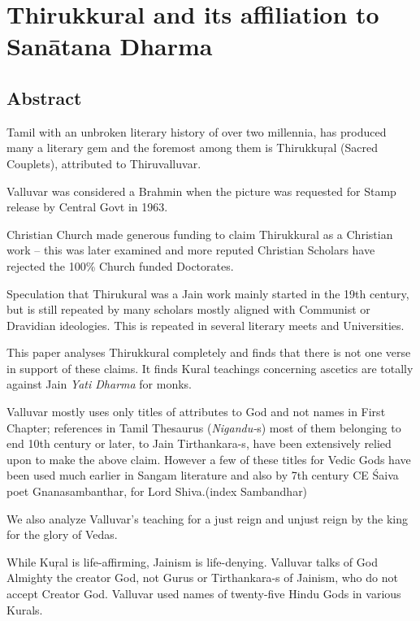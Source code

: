 
\chapter{Thirukkural and its affiliation to Sanātana Dharma}\label{intro}



\section*{Abstract}

Tamil with an unbroken literary history of over two millennia, has produced many a literary gem and the foremost among them is Thirukkuŗal (Sacred Couplets), attributed to Thiruvalluvar.

Valluvar was considered a Brahmin when the picture was requested for Stamp release by Central Govt in 1963.

Christian Church made generous funding to claim Thirukkural as a Christian work – this was later examined and more reputed Christian Scholars have rejected the 100\% Church funded Doctorates.

Speculation that Thirukural was a Jain work mainly started in the 19th century, but is still repeated by many scholars mostly aligned with Communist or Dravidian ideologies. This is repeated in several literary meets and Universities.

This paper analyses Thirukkural completely and finds that there is not one verse in support of these claims. It finds Kural teachings concerning ascetics are totally against Jain \textit{Yati Dharma} for monks.

Valluvar mostly uses only titles of attributes to God and not names in First Chapter; references in Tamil Thesaurus (\textit{Nigandu-}s) most of them belonging to end 10th century or later, to Jain Tirthankara-s, have been extensively relied upon to make the above claim. However a few of these titles for Vedic Gods have been used much earlier in Sangam literature and also by 7th century CE Śaiva poet Gnanasambanthar, for Lord Shiva.(index Sambandhar)

We also analyze Valluvar’s teaching for a just reign and unjust reign by the king for the glory of Vedas.

While Kuŗal is life-affirming, Jainism is life-denying. Valluvar talks of God Almighty the creator God, not Gurus or Tirthankara-s of Jainism, who do not accept Creator God. Valluvar used names of twenty-five Hindu Gods in various Kurals.

